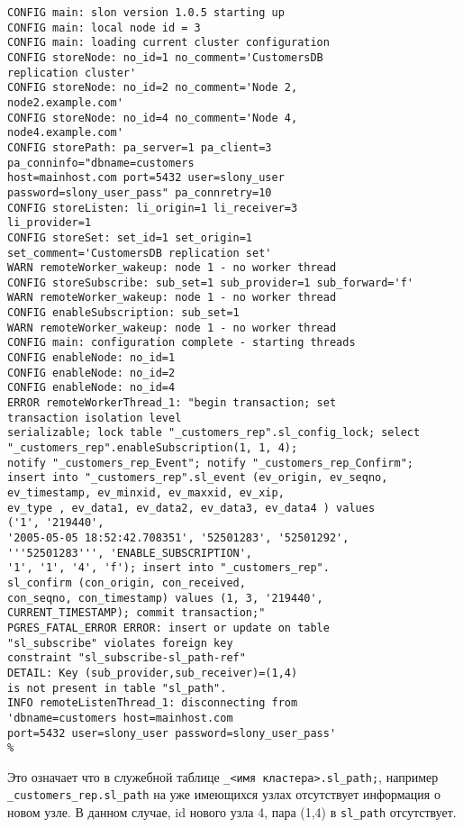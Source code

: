 \begin{lstlisting}[label=lst:slony17,caption=Устранение неисправностей]
%slon customers_rep "dbname=customers user=slony_user"
CONFIG main: slon version 1.0.5 starting up
CONFIG main: local node id = 3
CONFIG main: loading current cluster configuration
CONFIG storeNode: no_id=1 no_comment='CustomersDB
replication cluster'
CONFIG storeNode: no_id=2 no_comment='Node 2,
node2.example.com'
CONFIG storeNode: no_id=4 no_comment='Node 4,
node4.example.com'
CONFIG storePath: pa_server=1 pa_client=3
pa_conninfo="dbname=customers
host=mainhost.com port=5432 user=slony_user
password=slony_user_pass" pa_connretry=10
CONFIG storeListen: li_origin=1 li_receiver=3
li_provider=1
CONFIG storeSet: set_id=1 set_origin=1
set_comment='CustomersDB replication set'
WARN remoteWorker_wakeup: node 1 - no worker thread
CONFIG storeSubscribe: sub_set=1 sub_provider=1 sub_forward='f'
WARN remoteWorker_wakeup: node 1 - no worker thread
CONFIG enableSubscription: sub_set=1
WARN remoteWorker_wakeup: node 1 - no worker thread
CONFIG main: configuration complete - starting threads
CONFIG enableNode: no_id=1
CONFIG enableNode: no_id=2
CONFIG enableNode: no_id=4
ERROR remoteWorkerThread_1: "begin transaction; set
transaction isolation level
serializable; lock table "_customers_rep".sl_config_lock; select
"_customers_rep".enableSubscription(1, 1, 4);
notify "_customers_rep_Event"; notify "_customers_rep_Confirm";
insert into "_customers_rep".sl_event (ev_origin, ev_seqno,
ev_timestamp, ev_minxid, ev_maxxid, ev_xip,
ev_type , ev_data1, ev_data2, ev_data3, ev_data4 ) values
('1', '219440',
'2005-05-05 18:52:42.708351', '52501283', '52501292',
'''52501283''', 'ENABLE_SUBSCRIPTION',
'1', '1', '4', 'f'); insert into "_customers_rep".
sl_confirm (con_origin, con_received,
con_seqno, con_timestamp) values (1, 3, '219440',
CURRENT_TIMESTAMP); commit transaction;"
PGRES_FATAL_ERROR ERROR: insert or update on table
"sl_subscribe" violates foreign key
constraint "sl_subscribe-sl_path-ref"
DETAIL: Key (sub_provider,sub_receiver)=(1,4)
is not present in table "sl_path".
INFO remoteListenThread_1: disconnecting from
'dbname=customers host=mainhost.com
port=5432 user=slony_user password=slony_user_pass'
%
\end{lstlisting}


Это означает что в служебной таблице \lstinline!_<имя кластера>.sl_path;!, например \lstinline!_customers_rep.sl_path! на уже имеющихся узлах отсутствует информация о новом узле. В данном случае, id нового узла 4, пара (1,4) в \lstinline!sl_path! отсутствует.

